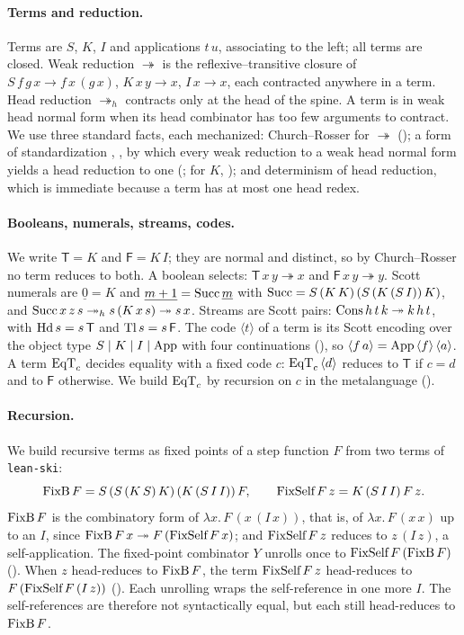 \documentclass[acmsmall,review,screen]{acmart}\def\acmclass{}
\theoremstyle{plain}
\theoremstyle{definition}
\theoremstyle{remark}
\newcommand{\code}[1]{\langle #1\rangle}
\newcommand{\red}{\twoheadrightarrow}
\newcommand{\hred}{\twoheadrightarrow_{h}}
\newcommand{\fn}[1]{\textup{#1}}  %
\newcommand{\T}{\mathsf{T}}
\newcommand{\F}{\mathsf{F}}
\newcommand{\num}[1]{\underline{#1}}
\begin{document}
\paragraph{Terms and reduction.}  Terms are $S$, $K$, $I$ and applications
$t\,u$, associating to the left; all terms are closed.  Weak reduction $\red$ is the
reflexive--transitive closure of $S\,f\,g\,x \to f\,x\,(g\,x)$, $K\,x\,y \to x$,
$I\,x \to x$, each contracted anywhere in a term.  Head reduction $\hred$ contracts only at the head
of the spine.  A term is in weak head normal form when its head combinator has too
few arguments to contract.  We use three standard facts, each mechanized:
Church--Rosser for $\red$ \citep[Thm.~2.15]{HindleySeldin2008} ();
a form of standardization \citep[\S11B3]{CHS1972}, \citep[Rem.~3.24]{HindleySeldin2008},
by which every weak reduction to a weak head normal form yields a head reduction to
one (; for $K$, ); and determinism of head
reduction, which is immediate because a term has at most one head redex.

\paragraph{Booleans, numerals, streams, codes.}  We write $\T = K$ and $\F = K\,I$; they are
normal and distinct, so by Church--Rosser no term reduces to both.  A boolean
selects: $\T\,x\,y \red x$ and $\F\,x\,y \red y$.  Scott numerals are
$\num{0} = K$ and $\num{m+1} = \fn{Succ}\,\num{m}$ with
$\fn{Succ} = S\,(K\,K)\,(S\,(K\,(S\,I))\,K)$, and
$\fn{Succ}\,x\,z\,s \hred s\,(K\,x\,s) \red s\,x$.  Streams are Scott pairs:
$\fn{Cons}\,h\,t\,k \red k\,h\,t$, with $\fn{Hd}\,s = s\,\T$ and
$\fn{Tl}\,s = s\,\F$.  The code $\code{t}$ of a term is its Scott encoding over the
object type $S \mid K \mid I \mid \fn{App}$ with four continuations
(), so $\code{f\,a} = \fn{App}\,\code{f}\,\code{a}$.  A term $\fn{EqT}_c$ decides equality with a
fixed code $c$:
$\fn{EqT}_c\,\code{d}$ reduces to $\T$ if $c = d$ and to $\F$ otherwise.  We build $\fn{EqT}_c$ by recursion on $c$ in the
metalanguage ().

\paragraph{Recursion.}  We build recursive terms as fixed points of a step function $F$
from two terms of \texttt{lean-ski}:
\[
  \fn{FixB}\,F = S\,(S\,(K\,S)\,K)\,(K\,(S\,I\,I))\,F, \qquad
  \fn{FixSelf}\,F\,z = K\,(S\,I\,I)\,F\,z.
\]
$\fn{FixB}\,F$ is the combinatory form of $\lambda x.\,F\,(x\,(I\,x))$, that is, of
$\lambda x.\,F\,(x\,x)$ up to an $I$, since
$\fn{FixB}\,F\,x \red F\,(\fn{FixSelf}\,F\,x)$; and $\fn{FixSelf}\,F\,z$ reduces to
$z\,(I\,z)$, a self-application.  The fixed-point combinator $Y$ unrolls once to
$\fn{FixSelf}\,F\,(\fn{FixB}\,F)$ ().  When $z$ head-reduces to
$\fn{FixB}\,F$, the term $\fn{FixSelf}\,F\,z$ head-reduces to
$F\,(\fn{FixSelf}\,F\,(I\,z))$ ().  Each unrolling wraps the
self-reference in one more $I$.  The self-references are therefore not syntactically
equal, but each still head-reduces to $\fn{FixB}\,F$.
\end{document}
